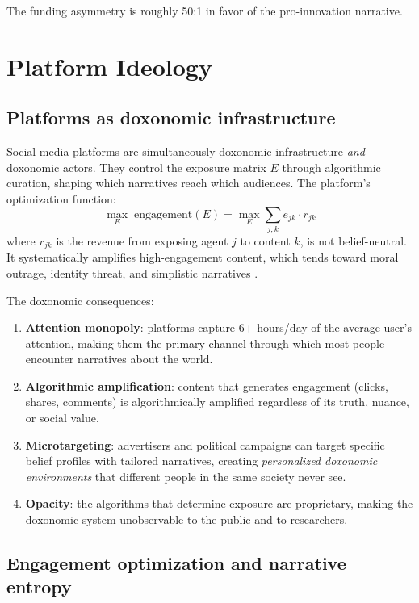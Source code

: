 The funding asymmetry is roughly 50:1 in favor of the pro-innovation narrative.

\section{Platform Ideology}
\label{sec:ch28-platforms}

\subsection{Platforms as doxonomic infrastructure}

\begin{model}
\label{mod:platform}
Social media platforms are simultaneously doxonomic infrastructure \emph{and} doxonomic actors.
They control the exposure matrix $E$ through algorithmic curation, shaping which narratives reach which audiences.
The platform's optimization function:
\[
  \max_E \; \text{engagement}(E) = \max_E \sum_{j,k} e_{jk} \cdot r_{jk}
\]
where $r_{jk}$ is the revenue from exposing agent $j$ to content $k$, is not belief-neutral.
It systematically amplifies high-engagement content, which tends toward moral outrage, identity threat, and simplistic narratives \autocite{zuboff2019}.
\end{model}

The doxonomic consequences:
\begin{enumerate}[nosep]
  \item \textbf{Attention monopoly}: platforms capture 6+ hours/day of the average user's attention, making them the primary channel through which most people encounter narratives about the world.
  \item \textbf{Algorithmic amplification}: content that generates engagement (clicks, shares, comments) is algorithmically amplified regardless of its truth, nuance, or social value.
  \item \textbf{Microtargeting}: advertisers and political campaigns can target specific belief profiles with tailored narratives, creating \emph{personalized doxonomic environments} that different people in the same society never see.
  \item \textbf{Opacity}: the algorithms that determine exposure are proprietary, making the doxonomic system unobservable to the public and to researchers.
\end{enumerate}

\subsection{Engagement optimization and narrative entropy}

